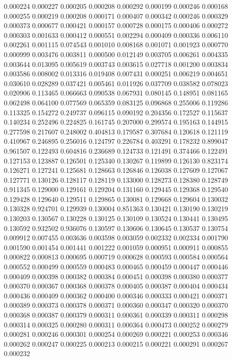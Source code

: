 0.000224
0.000227
0.000205
0.000208
0.000292
0.000199
0.000246
0.000168
0.000255
0.000219
0.000208
0.000171
0.000407
0.000342
0.000246
0.000329
0.000373
0.000677
0.000421
0.000157
0.000728
0.000175
0.000406
0.000272
0.000303
0.001633
0.000412
0.000551
0.002294
0.000409
0.000336
0.006110
0.002261
0.001115
0.074543
0.001010
0.008168
0.001071
0.001923
0.000770
0.000999
0.003476
0.003811
0.000500
0.012149
0.003705
0.006261
0.004335
0.003644
0.013095
0.005619
0.003743
0.003615
0.027718
0.001200
0.003834
0.003586
0.008002
0.013316
0.019408
0.007431
0.000251
0.006219
0.004651
0.030610
0.028289
0.037421
0.005461
0.011926
0.037709
0.038582
0.078023
0.020906
0.113465
0.066663
0.090538
0.067931
0.080145
0.148951
0.081165
0.062498
0.064100
0.077569
0.065359
0.083125
0.096868
0.255006
0.119286
0.113325
0.154272
0.249737
0.096115
0.090192
0.204356
0.172527
0.115637
0.140234
0.252496
0.224825
0.161745
0.207000
0.299574
0.195163
0.144915
0.277598
0.217607
0.248002
0.404813
0.179587
0.307684
0.120618
0.121119
0.410967
0.246895
0.256016
0.124797
0.226784
0.403291
0.178232
0.899047
0.961507
0.122493
0.604816
0.236689
0.124733
0.121491
0.374466
0.122491
0.127153
0.123887
0.126501
0.125340
0.130267
0.119899
0.126130
0.823174
0.126271
0.127241
0.125681
0.128663
0.126846
0.126038
0.127609
0.127067
0.127771
0.130126
0.128117
0.128119
0.133000
0.128273
0.128380
0.128749
0.911345
0.129000
0.129161
0.129204
0.131160
0.129445
0.129368
0.129540
0.129428
0.129640
0.129511
0.129865
0.130081
0.129668
0.129604
0.130032
0.130328
0.924701
0.129939
0.130004
0.851363
0.130421
0.130190
0.130219
0.130203
0.130567
0.130228
0.130125
0.130109
0.130524
0.130441
0.130495
0.130592
0.932502
0.936076
0.130597
0.130606
0.130645
0.130537
0.130754
0.009912
0.007455
0.003636
0.003598
0.003059
0.002332
0.002334
0.001790
0.001590
0.001454
0.001441
0.001222
0.001059
0.000951
0.000911
0.000855
0.000822
0.000813
0.000695
0.000719
0.000628
0.000593
0.000584
0.000564
0.000552
0.000499
0.000559
0.000483
0.000465
0.000459
0.000447
0.000446
0.000409
0.000398
0.000382
0.000384
0.000451
0.000398
0.000380
0.000377
0.000370
0.000367
0.000368
0.000378
0.000405
0.000387
0.000404
0.000434
0.000436
0.000409
0.000362
0.000400
0.000346
0.000333
0.000421
0.000371
0.000389
0.000373
0.000378
0.000371
0.000360
0.000347
0.000320
0.000370
0.000368
0.000387
0.000379
0.000311
0.000361
0.000339
0.000311
0.000298
0.000314
0.000325
0.000280
0.000311
0.000364
0.000473
0.000252
0.000279
0.000281
0.000246
0.000301
0.000254
0.000269
0.000221
0.000253
0.000346
0.000262
0.000247
0.000225
0.000213
0.000215
0.000221
0.000291
0.000267
0.000232
